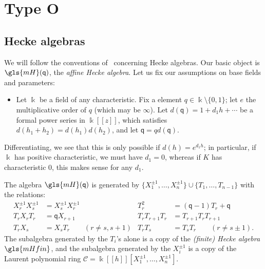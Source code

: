 \documentclass[10pt]{article}
\theoremstyle{definition}
\newcommand{\pq}{\mathsf{q}}
\newcommand{\K}{\Bbbk}%
\newcommand\llbracket{[\![}
\newcommand\rrbracket{]\!]}
\begin{document}
\section{Type O}

\subsection{Hecke algebras}
We will follow the conventions of~\cite{BKKL} concerning Hecke
algebras. 
Our basic object is $\gls{mH}(\pq)$, the \emph{affine Hecke algebra}. 
Let us fix our assumptions on base fields and parameters:
\begin{itemize}
\item [$(*)$] Let $\K$ be a field of any characteristic. Fix a element
$q\in \K\setminus\{0,1\}$; let $e$ the multiplicative order of $q$
(which may be $\infty$). Let $d(\pq)=1+d_1h+\cdots$ be a formal power series in
$\K\llbracket z\rrbracket $, which satisfies $d(h_1+h_2)=d(h_1)d(h_2)$, and let $\pq=qd(\pq)$. 
\end{itemize}
Differentiating, we see that this is only possible if $d(h)=e^{d_1h}$; in
particular, if $\K$ has positive characteristic, we must have
$d_1=0$, whereas if $K$ has characteristic 0, this makes sense for any
$d_1$.




The algebra $\gls{mH}(\pq)$ is generated by $\{X_1^{\pm 1},\dots,X_n^{\pm 1}
\}\cup \{T_1,\dots, T_{n-1}\}$ with the relations:
\begin{align*}
 X_r^{\pm 1} X_s^{\pm 1}&= X_s^{\pm 1} X_r^{\pm 1}& T_r^2&=(\pq-1)T_r
+\pq\\
T_rX_rT_r&=\pq X_{r+1} & T_rT_{r+1}T_r&=T_{r+1}T_r T_{r+1}\\
T_rX_s&= X_sT_r\qquad (r\neq s,s+1)&T_rT_s&=T_sT_r\qquad (r \neq
s\pm 1).
 \end{align*}
The subalgebra generated by the $T_i$'s alone is a copy of the \emph{(finite) Hecke algebra} $\gls{mHfin}$, and the subalgebra generated by the
$X_i^{\pm 1}$ is a copy of the Laurent polynomial ring
$\mathcal{C}=\K\llbracket h\rrbracket [X_1^{\pm 1},\dots,X_n^{\pm 1}]$.
 
\end{document}
